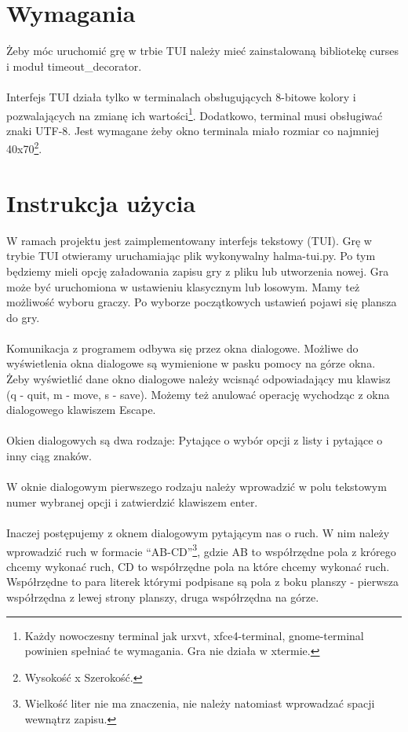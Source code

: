 \documentclass[12pt, titlepage]{article}
\begin{document}
\pagebreak
\section{Wymagania}
Żeby móc uruchomić grę w trbie TUI należy mieć zainstalowaną
bibliotekę curses i moduł timeout\_decorator.
\\~\\
Interfejs TUI działa tylko w terminalach obsługujących 8-bitowe
kolory i pozwalających na zmianę ich wartości\footnote{Każdy nowoczesny terminal jak urxvt, xfce4-terminal, gnome-terminal powinien spełniać te wymagania. Gra nie działa w xtermie.}.
Dodatkowo, terminal musi obsługiwać znaki UTF-8.
Jest wymagane żeby okno terminala miało rozmiar co
najmniej 40x70\footnote{Wysokość x Szerokość.}.

\section{Instrukcja użycia}
W ramach projektu jest zaimplementowany interfejs tekstowy (TUI).
Grę w trybie TUI otwieramy uruchamiając plik wykonywalny
halma-tui.py.
Po tym będziemy mieli opcję załadowania zapisu gry z pliku lub
utworzenia nowej. Gra może być uruchomiona w ustawieniu klasycznym
lub losowym. Mamy też możliwość wyboru graczy.
Po wyborze początkowych ustawień pojawi się plansza do gry.
\\~\\
Komunikacja z programem odbywa się przez okna dialogowe.
Możliwe do wyświetlenia okna dialogowe są wymienione
w pasku pomocy na górze okna. Żeby wyświetlić dane okno
dialogowe należy wcisnąć odpowiadający mu klawisz (q - quit,
m - move, s - save). Możemy też anulować operację wychodząc
z okna dialogowego klawiszem Escape.
\\~\\
Okien dialogowych są dwa rodzaje: Pytające o wybór opcji z listy i
pytające o inny ciąg znaków.
\\~\\
W oknie dialogowym pierwszego rodzaju należy wprowadzić w
polu tekstowym numer wybranej opcji i zatwierdzić
klawiszem enter.
\\~\\
Inaczej postępujemy z oknem dialogowym pytającym nas o ruch.
W nim należy wprowadzić ruch w formacie "`AB-CD"'\footnote{Wielkość liter nie ma znaczenia, nie należy natomiast wprowadzać spacji wewnątrz zapisu.}, gdzie AB
to współrzędne pola z krórego chcemy wykonać ruch, CD to
współrzędne pola na które chcemy wykonać ruch. Współrzędne
to para literek którymi podpisane są pola z boku planszy -
pierwsza współrzędna z lewej strony planszy, druga współrzędna
na górze.
\end{document}
